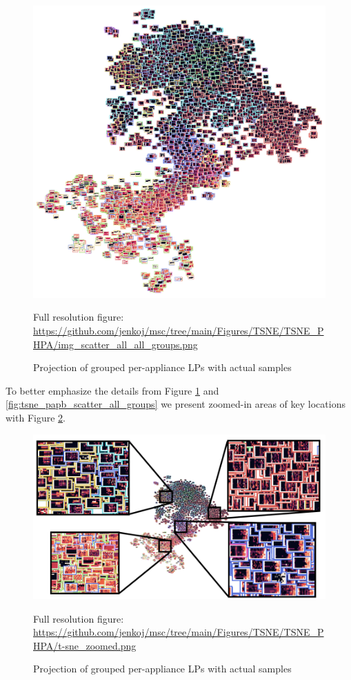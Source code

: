 \begin{figure}[H]  
	\centering
	\caption{Projection of grouped per-appliance LPs with actual samples}
	\includegraphics[width=1.1\textwidth]{Figures/TSNE/TSNE_PHPA/img_scatter_all_all_groups.png}
	\label{fig:tsne_papb_img_scatter_all_groups}
	\par
	\par\footnotesize{Full resolution figure: \url{https://github.com/jenkoj/msc/tree/main/Figures/TSNE/TSNE_PHPA/img_scatter_all_all_groups.png}}
\end{figure}

To better emphasize the details from Figure \ref{fig:tsne_papb_img_scatter_all_groups} and \ref{fig:tsne_papb_scatter_all_groups} we present zoomed-in areas of key locations with Figure \ref{fig:t-sne_zoomed}.
\begin{figure}[H] 
	\centering
	\caption{Projection of grouped per-appliance LPs with actual samples}
	\includegraphics[width=1\textwidth]{Figures/TSNE/TSNE_PHPA/t-sne_zoomed.png}
	\label{fig:t-sne_zoomed}
	\par
	\par\footnotesize{Full resolution figure: \url{https://github.com/jenkoj/msc/tree/main/Figures/TSNE/TSNE_PHPA/t-sne_zoomed.png}}
\end{figure}

